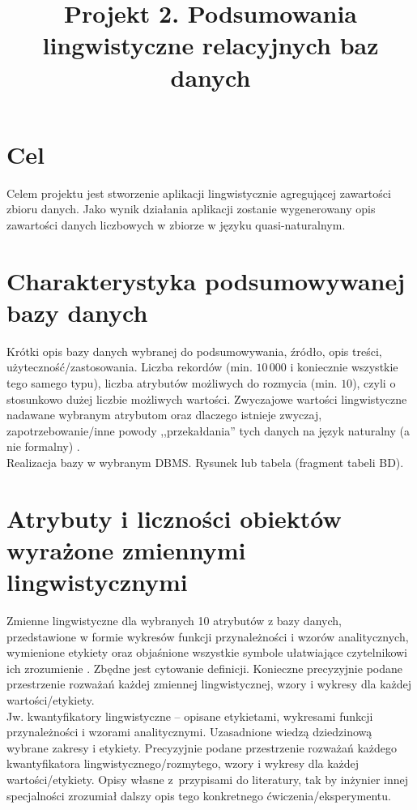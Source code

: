 \documentclass{classrep}
\author{
  \studentinfo{Julia Szymańska}{224441} \and
  \studentinfo{Przemysław Zdrzalik}{224466} }
\title{Projekt 2.  Podsumowania lingwistyczne relacyjnych baz danych}
\begin{document}
\maketitle

\section{Cel}
Celem projektu jest stworzenie aplikacji lingwistycznie agregującej zawartości zbioru danych. Jako wynik działania aplikacji zostanie wygenerowany opis zawartości danych liczbowych w zbiorze w języku quasi-naturalnym.


\section{Charakterystyka podsumowywanej bazy danych}
Krótki opis bazy danych wybranej do podsumowywania, źródło, opis treści,
użyteczność/zastosowania. Liczba rekordów (min. $10\,000$ i koniecznie wszystkie tego
samego typu), liczba atrybutów możliwych do rozmycia (min. $10$), czyli o stosunkowo dużej
liczbie możliwych wartości. Zwyczajowe wartości lingwistyczne nadawane wybranym
atrybutom oraz dlaczego istnieje zwyczaj, zapotrzebowanie/inne powody
,,przekałdania'' tych danych na język
naturalny (a nie formalny) \cite{niewiadomski19, niewiadomski08}.\\
Realizacja bazy w wybranym DBMS. Rysunek lub tabela (fragment tabeli BD).\\ 

\section{Atrybuty i liczności obiektów wyrażone zmiennymi lingwistycznymi}
Zmienne lingwistyczne dla wybranych 10 atrybutów z bazy danych, przedstawione w
formie wykresów funkcji przynależności i wzorów analitycznych, wymienione etykiety oraz objaśnione wszystkie
symbole ułatwiające czytelnikowi ich zrozumienie \cite{zadrozny06}. Zbędne jest
cytowanie definicji. Konieczne precyzyjnie podane przestrzenie rozważań każdej
zmiennej lingwistycznej, wzory i wykresy dla każdej wartości/etykiety.\\
Jw. kwantyfikatory lingwistyczne -- opisane etykietami, wykresami funkcji
przynależności i wzorami analitycznymi. Uzasadnione wiedzą dziedzinową wybrane
zakresy i etykiety. Precyzyjnie podane przestrzenie rozważań każdego kwantyfikatora 
lingwistycznego/rozmytego, wzory i wykresy dla każdej wartości/etykiety. Opisy własne z~przypisami do literatury, tak by inżynier innej specjalności zrozumiał dalszy
opis tego konkretnego ćwiczenia/eksperymentu. \\ 
\end{document}
